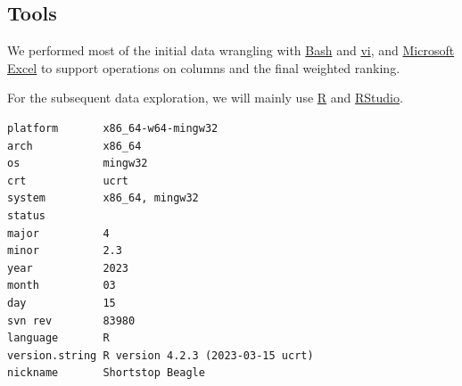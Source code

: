 \subsection{Tools}

We performed most of the initial data wrangling with \href{https://www.gnu.org/software/bash/}{Bash} and \href{https://pubs.opengroup.org/onlinepubs/9699919799/utilities/vi.html}{vi}, and \href{https://www.microsoft.com/en-us/microsoft-365/excel}{Microsoft Excel} to support operations on columns and the final weighted ranking.

For the subsequent data exploration, we will mainly use \href{https://www.r-project.org/}{R} and \href{https://posit.co/download/rstudio-desktop/}{RStudio}.

\begin{Shaded}
\begin{Highlighting}[]
\end{Highlighting}
\end{Shaded}

\begin{verbatim}
platform       x86_64-w64-mingw32               
arch           x86_64                           
os             mingw32                          
crt            ucrt                             
system         x86_64, mingw32                  
status                                          
major          4                                
minor          2.3                              
year           2023                             
month          03                               
day            15                               
svn rev        83980                            
language       R                                
version.string R version 4.2.3 (2023-03-15 ucrt)
nickname       Shortstop Beagle                 
\end{verbatim}
